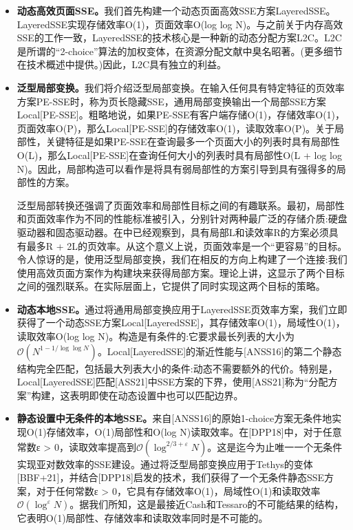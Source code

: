 \documentclass[UTF8]{article}
\begin{document}
\begin{itemize}
  \item \textbf{动态高效页面SSE。}我们首先构建一个动态页面高效SSE方案LayeredSSE。LayeredSSE实现存储效率O(1)，页面效率O(log log N)。与之前关于内存高效SSE的工作一致，LayeredSSE的技术核心是一种新的动态分配方案L2C。L2C是所谓的“2-choice”算法的加权变体，在资源分配文献中臭名昭著。(更多细节在技术概述中提供。)因此，L2C具有独立的利益。
  \item \textbf{泛型局部变换。}我们将介绍泛型局部变换。在输入任何具有特定特征的页效率方案PE-SSE时，称为页长隐藏SSE，通用局部变换输出一个局部SSE方案Local[PE-SSE]。粗略地说，如果PE-SSE有客户端存储O(1)，存储效率O(1)，页面效率O(P)，那么Local[PE-SSE]的存储效率O(1)，读取效率O(P)。关于局部性，关键特征是如果PE-SSE在查询最多一个页面大小的列表时具有局部性O(L)，那么Local[PE-SSE]在查询任何大小的列表时具有局部性O(L + log log N)。因此，局部构造可以看作是将具有弱局部性的方案引导到具有强得多的局部性的方案。
  
  泛型局部转换还强调了页面效率和局部性目标之间的有趣联系。最初，局部性和页面效率作为不同的性能标准被引入，分别针对两种最广泛的存储介质:硬盘驱动器和固态驱动器。在\cite{AngleBossuat2021SSEAS}中已经观察到，具有局部L和读效率R的方案必须具有最多R + 2L的页效率。从这个意义上说，页面效率是一个“更容易”的目标。令人惊讶的是，使用泛型局部变换，我们在相反的方向上构建了一个连接:我们使用高效页面方案作为构建块来获得局部方案。理论上讲，这显示了两个目标之间的强烈联系。在实际层面上，它提供了同时实现这两个目标的策略。
  \item \textbf{动态本地SSE。}通过将通用局部变换应用于LayeredSSE页效率方案，我们立即获得了一个动态SSE方案Local[LayeredSSE]，其存储效率O(1)，局域性O(1)，读取效率O(log log N)。构造是有条件的:它要求最长列表的大小为$\mathcal{O}\left(N^{1-1 / \log \log N}\right)$。Local[LayeredSSE]的渐近性能与[ANSS16]的第二个静态结构完全匹配，包括最大列表大小的条件:动态不需要额外的代价。特别是，Local[LayeredSSE]匹配[ASS21]中SSE方案的下界，使用[ASS21]称为“分配方案”构建，这表明即使在动态设置中也可以匹配边界。
  \item \textbf{静态设置中无条件的本地SSE。}来自[ANSS16]的原始1-choice方案无条件地实现O(1)存储效率，O(1)局部性和O(log N)读取效率。在[DPP18]中，对于任意常数ε > 0，读取效率提高到$\mathcal{O}\left(\log ^{2 / 3+\varepsilon} N\right)$。这是迄今为止唯一一个无条件实现亚对数效率的SSE建设。通过将泛型局部变换应用于Tethys的变体[BBF+21]，并结合[DPP18]启发的技术，我们获得了一个无条件静态SSE方案，对于任何常数ε > 0，它具有存储效率O(1)，局域性O(1)和读取效率$\mathcal{O}\left(\log ^{\varepsilon} N\right)$。据我们所知，这是最接近Cash和Tessaro的不可能结果的结构，它表明O(1)局部性、存储效率和读取效率同时是不可能的。
\end{itemize}
\end{document}
